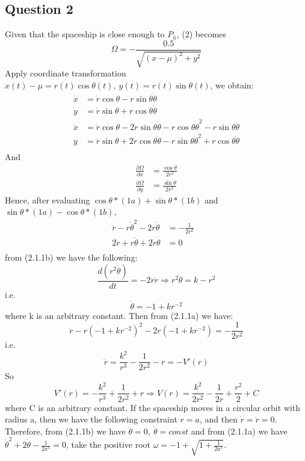 \documentclass[11pt]{article}
\begin{document}
\subsection{Question 2}
Given that the spaceship is close enough to $P_{h}$, (2) becomes
\begin{equation*}
\Omega = -\frac{0.5}{\sqrt{(x-\mu)^{2}+y^{2}}} 
\end{equation*}
Apply coordinate transformation $x(t)-\mu = r(t)\cos\theta(t),\ y(t) = r(t)\sin\theta(t)$, we obtain:
\begin{align*}
\dot{x} &= \dot{r} \cos \theta-r \sin \theta \dot{\theta} 
\\
\dot{y} &= \dot{r} \sin \theta+r \cos \theta \dot{\theta}
\\
\ddot{x} &= \ddot{r}\cos\theta -2\dot{r} \sin\theta \dot{\theta} -r\cos\theta {\dot{\theta}}^{2}-r\sin\theta\ddot{\theta}
\\
\ddot{y} &= \ddot{r}\sin\theta + 2\dot{r}\cos\theta\dot{\theta}-r\sin\theta\dot{\theta}^2+r\cos{\theta}\ddot{\theta}
\\
\end{align*}
And 
\begin{align*}
\frac{\partial \Omega}{\partial x} &= \frac{\cos\theta}{2r^{2}} \\
\frac{\partial \Omega}{\partial y} &= \frac{\sin\theta}{2r^{2}} 
\end{align*}
Hence, after evaluating $\cos\theta*(1a)+\sin\theta*(1b)$ and $\sin\theta*(1a)-\cos\theta*(1b)$,
\begin{align*}
\ddot{r}-r{\dot{\theta}}^{2}-2r\dot{\theta} &= -\frac{1}{2r^{2}}
&\tag{2.1.1a}\\
2\dot{r}+r\ddot{\theta}+2\dot{r}\dot{\theta} &= 0
&\tag{2.1.1b}\\
\end{align*}
from (2.1.1b) we have the following:$$\frac{d(r^{2}\dot{\theta})}{dt}= -2r\dot{r} \Longrightarrow r^{2}\dot{\theta} = k-r^{2}
$$ i.e.$$\dot{\theta} = -1+kr^{-2}$$where k is an arbitrary constant.
Then from (2.1.1a) we have: $$\ddot{r} - r(-1+kr^{-2})^{2}-2r(-1+kr^{-2})= -\frac{1}{2r^{2}}$$i.e.
$$\ddot{r} =\frac{k^{2}}{r^{3}}-\frac{1}{2r^{2}}-r=-V'(r)$$
So $$V'(r) = -\frac{k^{2}}{r^{3}}+\frac{1}{2r^{2}}+r \Longrightarrow V(r) = \frac{k^{2}}{2r^{2}}-\frac{1}{2r}+\frac{r^{2}}{2}+C$$
where C is an arbitrary constant.
If the spaceship moves in a circular orbit with radius a, then we have the following constraint $r = a$, and then $\dot{r} = \ddot{r} = 0$.
\newline 
Therefore, from (2.1.1b) we have $\ddot{\theta} = 0,\ \dot{\theta} = const$ and from (2.1.1a) we have $\dot{\theta}^{2}+2\dot{\theta} - \frac{1}{2a^{3}}= 0 $, take the positive root $\omega = -1+\sqrt{1+\frac{1}{2a^{3}}}$.
\end{document}
